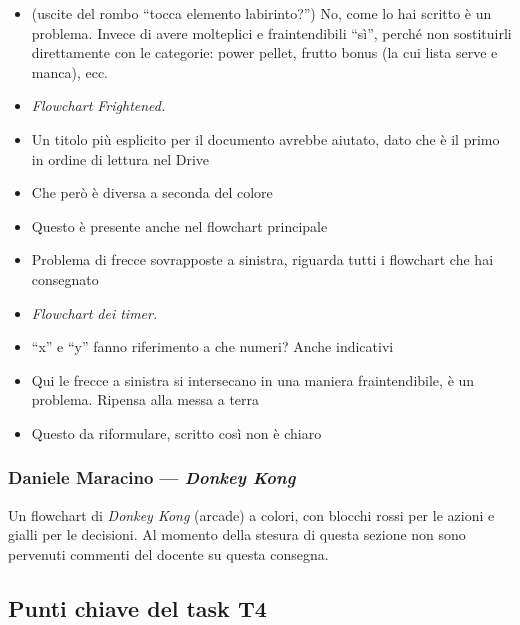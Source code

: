 {\begin{itemize}
  \item {} (uscite del rombo ``tocca elemento labirinto?'') No, come lo hai scritto è un problema. Invece di avere molteplici e fraintendibili ``sì'', perché non sostituirli direttamente con le categorie: power pellet, frutto bonus (la cui lista serve e manca), ecc.
  \item \emph{Flowchart Frightened.}
  \item {} Un titolo più esplicito per il documento avrebbe aiutato, dato che è il primo in ordine di lettura nel Drive
  \item {} Che però è diversa a seconda del colore
  \item {} Questo è presente anche nel flowchart principale
  \item {} Problema di frecce sovrapposte a sinistra, riguarda tutti i flowchart che hai consegnato
  \item \emph{Flowchart dei timer.}
  \item {} ``x'' e ``y'' fanno riferimento a che numeri? Anche indicativi
  \item {} Qui le frecce a sinistra si intersecano in una maniera fraintendibile, è un problema. Ripensa alla messa a terra
  \item {} Questo da riformulare, scritto così non è chiaro
\end{itemize}
}

\subsubsection{Daniele Maracino --- \emph{Donkey Kong}}
Un flowchart di \emph{Donkey Kong} (arcade) a colori, con blocchi rossi per le
azioni e gialli per le decisioni. Al momento della stesura di questa sezione
non sono pervenuti commenti del docente su questa consegna.

\subsection{Punti chiave del task T4}
\label{rv:t4:sec:punti-chiave}


